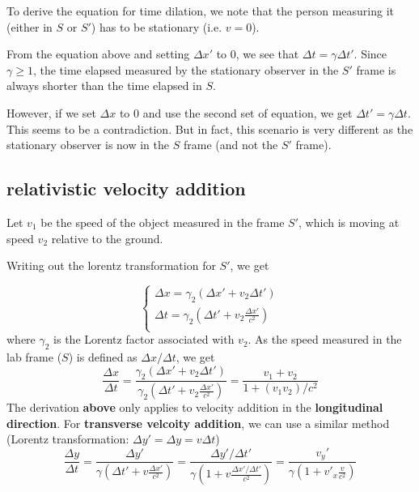 To derive the equation for time dilation, we note that the person measuring it (either in $S$ or $S'$) has to be stationary (i.e. $v=0$).

From the equation above and setting $\Delta x'$ to 0, we see that $\Delta t=\gamma \Delta t'$. Since $\gamma\geq 1$, the time elapsed measured by the stationary observer in the $S'$ frame is always shorter than the time elapsed in $S$. 

However, if we set $\Delta x$ to 0 and use the second set of equation, we get $\Delta t'=\gamma \Delta t$. This seems to be a contradiction. But in fact, this scenario is very different as the stationary observer is now in the $S$ frame (and not the $S'$ frame).

\subsection{relativistic velocity addition}
Let $v_1$ be the speed of the object measured in the frame $S'$, which is moving at speed $v_2$ relative to the ground.

Writing out the lorentz transformation for $S'$, we get 

\begin{equation}
    \begin{cases}
        \Delta x= \gamma_2 (\Delta x'+v_2 \Delta t')\\
        \Delta t = \gamma_2 (\Delta t'+v_2 \frac{\Delta x'}{c^2})\\
    \end{cases}
\end{equation}
where $\gamma_2$ is the Lorentz factor associated with $v_2$.
As the speed measured in the lab frame ($S$) is defined as $\Delta x/\Delta t$, we get 
\begin{equation}
    \frac{\Delta x}{\Delta t}= \frac{\gamma_2 (\Delta x'+v_2 \Delta t')}{\gamma_2 (\Delta t'+v_2 \frac{\Delta x'}{c^2})} = \frac{v_1+v_2}{1+(v_1 v_2)/c^2}
\end{equation}
The derivation \textbf{above} only applies to velocity addition in the \textbf{longitudinal direction}. For \textbf{transverse velcoity addition}, we can use a similar method (Lorentz transformation: $\Delta y'=\Delta y= v \Delta t $)
\begin{equation}
    \frac{\Delta y}{\Delta t}=\frac{\Delta y'}{\gamma (\Delta t'+v \frac{\Delta x'}{c^2})} =\frac{\Delta y'/\Delta t'}{\gamma (1 +v \frac{\Delta x'/\Delta t'}{c^2})}= \frac{v_y'}{\gamma (1+v'_x\frac{v}{c^2})}
\end{equation}

